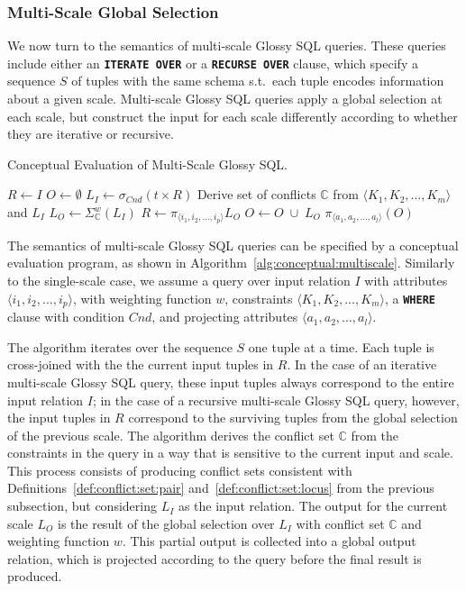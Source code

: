 \documentclass[11pt, oneside]{report}
\begin{document}
{\subsubsection{Multi-Scale Global Selection}
\label{sec:semantics:multiscale}

We now turn to the semantics of multi-scale Glossy SQL queries. These queries include either an \textbf{\texttt{ITERATE OVER}} or a \textbf{\texttt{RECURSE OVER}} clause, which specify a sequence $S$ of tuples with the same schema s.t.~each tuple encodes information about a given scale. Multi-scale Glossy SQL queries apply a global selection at each scale, but construct the input for each scale differently according to whether they are iterative or recursive.

\begin{algorithm}
\caption{Conceptual Evaluation of Multi-Scale Glossy SQL.}
\begin{algorithmic}
\STATE $R \leftarrow I$
\STATE $O \leftarrow \emptyset$
\STATE $L_I \leftarrow \sigma_{Cnd}(t \times R)$
\STATE Derive set of conflicts $\mathbb{C}$ from $\langle K_1, K_2, \ldots, K_m\rangle$ and $L_I$
\STATE $L_O \leftarrow \Sigma_{\mathbb{C}}^{w}(L_I)$ 
\STATE $R \leftarrow \pi_{\langle i_1, i_2, \ldots, i_p \rangle} L_O$ 
\ENDIF
\STATE $O \leftarrow O \; \cup \; L_O$
\ENDFOR
\RETURN $\pi_{\langle a_1, a_2, \ldots, a_l \rangle} (O)$
\end{algorithmic}
\label{alg:conceptual:multiscale}
\end{algorithm}

The semantics of multi-scale Glossy SQL queries can be specified by a conceptual evaluation program, as shown in Algorithm~\ref{alg:conceptual:multiscale}. Similarly to the single-scale case, we assume a query over input relation $I$ with attributes $\langle i_1, i_2, \ldots, i_p \rangle$, with weighting function $w$, constraints $\langle K_1, K_2, \ldots, K_m\rangle$, a \textbf{\texttt{WHERE}} clause with condition $Cnd$, and projecting attributes $\langle a_1, a_2, \ldots, a_l \rangle$.   


The algorithm iterates over the sequence $S$ one tuple at a time. Each tuple is cross-joined with the the current input tuples in $R$. In the case of an iterative multi-scale Glossy SQL query, these input tuples always correspond to the entire input relation $I$; in the case of a recursive multi-scale Glossy SQL query, however, the input tuples in $R$ correspond to the surviving tuples from the global selection of the previous scale. The algorithm derives the conflict set $\mathbb{C}$ from the constraints in the query in a way that is sensitive to the current input and scale. This process consists of producing conflict sets consistent with Definitions~\ref{def:conflict:set:pair} and~\ref{def:conflict:set:locus} from the previous subsection, but considering $L_I$ as the input relation. The output for the current scale $L_O$ is the result of the global selection over $L_I$ with conflict set $\mathbb{C}$ and weighting function $w$. This partial output is collected into a global output relation, which is projected according to the query before the final result is produced.  

}
\end{document}
